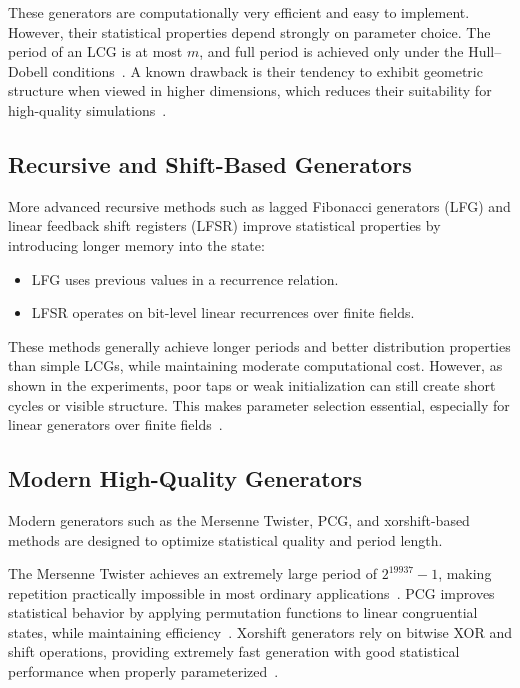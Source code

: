 These generators are computationally very efficient and easy to implement. However, their statistical properties depend strongly on parameter choice. The period of an LCG is at most $m$, and full period is achieved only under the Hull--Dobell conditions~\cite{hull1962random}. A known drawback is their tendency to exhibit geometric structure when viewed in higher dimensions, which reduces their suitability for high-quality simulations~\cite{lecuyer1999tables}.

\subsection{Recursive and Shift-Based Generators}

More advanced recursive methods such as lagged Fibonacci generators (LFG) and linear feedback shift registers (LFSR) improve statistical properties by introducing longer memory into the state:

\begin{itemize}
    \item LFG uses previous values in a recurrence relation.
    \item LFSR operates on bit-level linear recurrences over finite fields.
\end{itemize}

These methods generally achieve longer periods and better distribution properties than simple LCGs, while maintaining moderate computational cost. However, as shown in the experiments, poor taps or weak initialization can still create short cycles or visible structure. This makes parameter selection essential, especially for linear generators over finite fields~\cite{golomb1967shift}.

\subsection{Modern High-Quality Generators}

Modern generators such as the Mersenne Twister, PCG, and xorshift-based methods are designed to optimize statistical quality and period length.

The Mersenne Twister achieves an extremely large period of $2^{19937}-1$, making repetition practically impossible in most ordinary applications~\cite{matsumoto1998mersenne}. PCG improves statistical behavior by applying permutation functions to linear congruential states, while maintaining efficiency~\cite{oneill2014pcg}. Xorshift generators rely on bitwise XOR and shift operations, providing extremely fast generation with good statistical performance when properly parameterized~\cite{marsaglia2003xorshift}.


